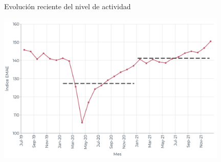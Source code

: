 \documentclass{beamer}
\begin{document}
\begin{frame}{Evolución reciente del nivel de actividad}

    \centering\includegraphics[width=11cm]{../Figures/32.16.png}

\end{frame}
\end{document}
